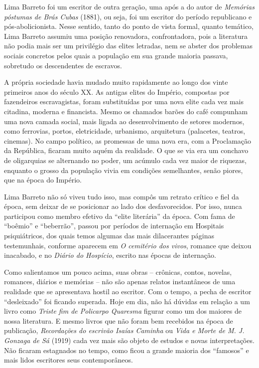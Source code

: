 Lima Barreto foi um escritor de outra geração, uma após a do autor de
\emph{Memórias póstumas de Brás Cubas} (1881), ou seja, foi um escritor
do período republicano e pós-abolicionista. Nesse sentido, tanto do
ponto de vista formal, quanto temático, Lima Barreto assumiu uma posição
renovadora, confrontadora, pois a literatura não podia mais ser um
privilégio das elites letradas, nem se abster dos problemas sociais
concretos pelos quais a população em sua grande maioria passava,
sobretudo os descendentes de escravos.

A própria sociedade havia mudado muito rapidamente ao longo dos vinte
primeiros anos do século XX. As antigas elites do Império, compostas por
fazendeiros escravagistas, foram substituídas por uma nova elite cada
vez mais citadina, moderna e financista. Mesmo os chamados barões do
café compunham uma nova camada social, mais ligada ao desenvolvimento de
setores modernos, como ferrovias, portos, eletricidade, urbanismo,
arquitetura (palacetes, teatros, cinemas). No campo político, as
promessas de uma nova era, com a Proclamação da República, ficaram muito
aquém da realidade. O que se via era um conchavo de oligarquias se
alternando no poder, um acúmulo cada vez maior de riquezas, enquanto o
grosso da população vivia em condições semelhantes, senão piores, que na
época do Império.

Lima Barreto não só viveu tudo isso, mas compôs um retrato crítico e
fiel da época, sem deixar de se posicionar ao lado dos desfavorecidos.
Por isso, nunca participou como membro efetivo da ``elite literária'' da
época. Com fama de ``boêmio'' e ``beberrão'', passou por períodos de
internação em Hospitais psiquiátricos, dos quais temos algumas das mais
dilacerantes páginas testemunhais, conforme aparecem em \emph{O
cemitério dos vivos}, romance que deixou inacabado, e no \emph{Diário do
Hospício}, escrito nas épocas de internação.

Como salientamos um pouco acima, suas obras -- crônicas, contos,
novelas, romances, diários e memórias -- não são apenas relatos
instantâneos de uma realidade que se apresentava hostil ao escritor. Com
o tempo, a pecha de escritor ``desleixado'' foi ficando superada. Hoje
em dia, não há dúvidas em relação a um livro como \emph{Triste fim de
Policarpo Quaresma} figurar como um dos maiores de nossa literatura. E
mesmo livros que não foram bem recebidos na época de publicação,
\emph{Recordações do escrivão Isaías Caminha} ou \emph{Vida e Morte de
M. J. Gonzaga de Sá} (1919) cada vez mais são objeto de estudos e novas
interpretações. Não ficaram estagnados no tempo, como ficou a grande
maioria dos ``famosos'' e mais lidos escritores seus contemporâneos.

